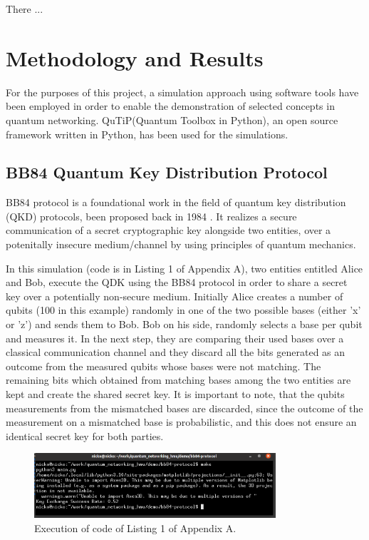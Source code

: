 \documentclass[12pt,a4paper] {report}
\begin{document}
				
		There ...  \cite{powergrid}







	\chapter{Methodology and Results}
		
		For the purposes of this project, a
		simulation approach using software tools
		have been employed in order to enable the
		demonstration of selected concepts in quantum networking.
		QuTiP(Quantum Toolbox in Python)\cite{qutip}, an open source framework
		written in Python, has been used for the simulations.

		\section{BB84 Quantum Key Distribution Protocol}

		BB84 protocol is a foundational work in the field
		of quantum key distribution (QKD) protocols,
		been proposed back in 1984 \cite{bb84}.
		It realizes a secure communication of a secret cryptographic key
		alongside two entities, over a potenitally insecure medium/channel
		by using principles of quantum mechanics.
		
		In this simulation (code is in Listing 1 of Appendix A),
		two entities entitled Alice and Bob, execute the QDK using the BB84 protocol
		in order to share a secret key over a potentially non-secure medium. Initially Alice creates
		a number of qubits (100 in this example) randomly in one of the two possible bases (either 'x' or 'z') and sends them 
		to Bob. Bob on his side, randomly selects a base per qubit and measures it. In the next step, 
		they are comparing their used bases over a classical communication channel and 
		they discard all the bits generated as an outcome from the measured qubits whose bases were not matching.
		The remaining bits which obtained from matching bases among the two entities are kept and create the shared secret key.
		It is important to note, that the qubits measurements from the mismatched bases are 
		discarded, since the outcome of the measurement on a mismatched base is probabilistic,
		and this does not ensure an identical secret key for both parties.
		\begin{figure}[h!]
			\centering
			\includegraphics[width=0.8\textwidth]{bb84/success_rate_terminal.png}
			\caption{Execution of code of Listing 1 of Appendix A.}
			\label{fig:}
		\end{figure}		
\end{document}
